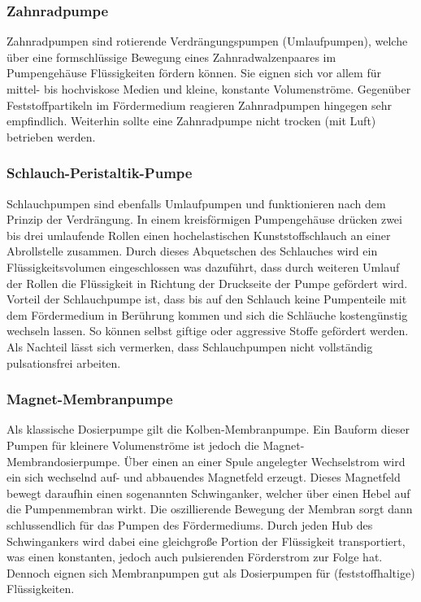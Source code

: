 \subsubsection*{Zahnradpumpe}
Zahnradpumpen sind rotierende Verdrängungspumpen (Umlaufpumpen), welche über eine formschlüssige Bewegung eines Zahnradwalzenpaares im Pumpengehäuse Flüssigkeiten fördern können. Sie eignen sich vor allem für mittel- bis hochviskose Medien und kleine, konstante Volumenströme. Gegenüber Feststoffpartikeln im Fördermedium reagieren Zahnradpumpen hingegen sehr empfindlich. Weiterhin sollte eine Zahnradpumpe nicht trocken (mit Luft) betrieben werden. \cite{Ignatowitz.2013} 

\subsubsection*{Schlauch-Peristaltik-Pumpe}
Schlauchpumpen sind ebenfalls Umlaufpumpen und funktionieren nach dem Prinzip der Verdrängung. In einem kreisförmigen Pumpengehäuse drücken zwei bis drei umlaufende Rollen einen hochelastischen Kunststoffschlauch an einer Abrollstelle zusammen. Durch dieses Abquetschen des Schlauches wird ein Flüssigkeitsvolumen eingeschlossen was dazuführt, dass durch weiteren Umlauf der Rollen die Flüssigkeit in Richtung der Druckseite der Pumpe gefördert wird. Vorteil der Schlauchpumpe ist, dass bis auf den Schlauch keine Pumpenteile mit dem Fördermedium in Berührung kommen und sich die Schläuche kostengünstig wechseln lassen. So können selbst giftige oder aggressive Stoffe gefördert werden. Als Nachteil lässt sich vermerken, dass Schlauchpumpen nicht vollständig pulsationsfrei arbeiten. \cite{Ignatowitz.2013}

\subsubsection*{Magnet-Membranpumpe}
Als klassische Dosierpumpe gilt die Kolben-Membranpumpe. Ein Bauform dieser Pumpen für kleinere Volumenströme ist jedoch die Magnet-Membrandosierpumpe. Über einen an einer Spule angelegter Wechselstrom wird ein sich wechselnd auf- und abbauendes Magnetfeld erzeugt. Dieses Magnetfeld bewegt daraufhin einen sogenannten Schwinganker, welcher über einen Hebel auf die Pumpenmembran wirkt. Die oszillierende Bewegung der Membran sorgt dann schlussendlich für das Pumpen des Fördermediums. Durch jeden Hub des Schwingankers wird dabei eine gleichgroße Portion der Flüssigkeit transportiert, was einen  konstanten, jedoch auch pulsierenden Förderstrom zur Folge hat. Dennoch eignen sich Membranpumpen gut als Dosierpumpen für (feststoffhaltige) Flüssigkeiten.  

